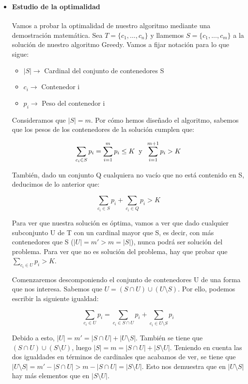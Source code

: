 \documentclass[10pt,a4paper]{article}
\begin{document}
	
	
	\begin{itemize}
		\item \textbf{Estudio de la optimalidad}
		\\
		\\
		Vamos a probar la optimalidad de nuestro algoritmo mediante una demostración matemática. Sea $T = \lbrace c_{1},...,c_{n} \rbrace$ y llamemos $S = \lbrace c_{1},...,c_{m} \rbrace$ a la solución de nuestro algoritmo Greedy. Vamos a fijar notación para lo que sigue:
		
		\begin{itemize}
			\item $|S| \rightarrow$ Cardinal del conjunto de contenedores S
			\item $c_{i} \rightarrow$ Contenedor i
			\item $p_{i} \rightarrow$ Peso del contenedor i
		\end{itemize}
	
	Consideramos que $|S| = m$. Por cómo hemos diseñado el algoritmo, sabemos que los pesos de los contenedores de la solución cumplen que:
	
	\[
	\sum_{c_{i} \in S}p_{i} = \sum_{i = 1}^{m}p_{i} \leq  K \hspace{0.2cm} \text{y} \hspace{0.2cm} \sum_{i = 1}^{m+1}p_{i} > K
	\]
	
	También, dado un conjunto Q cualquiera no vacío que no está contenido en S, deducimos de lo anterior que:
	
	\[
	\sum_{c_{i} \in S}p_{i} + \sum_{c_{i} \in Q}p_{i} > K
	\]
	
	Para ver que nuestra solución es óptima, vamos a ver que dado cualquier subconjunto U de T con un cardinal mayor que S, es decir, con más contenedores que S ($|U| = m' > m = |S|$), nunca podrá ser solución del problema. Para ver que no es solución del problema, hay que probar que $\sum_{c_{i} \in U}p_{i} > K$.
	
	Comenzaremos descomponiendo el conjunto de contenedores U de una forma que nos interesa. Sabemos que $U = (S \cap U) \cup (U\setminus S)$. Por ello, podemos escribir la siguiente igualdad:
	
	\[
	\sum_{c_{i} \in U}p_{i} = \sum_{c_{i} \in S \cap U}p_{i} + \sum_{c_{i} \in U \setminus S}p_{i} 
	\]
	
	Debido a esto, $|U| = m' = |S \cap U| + |U\setminus S|$. También se tiene que $(S \cap U) \cup (S\setminus U)$, luego $|S| = m = |S \cap U| + |S\setminus U|$. Teniendo en cuenta las dos igualdades en términos de cardinales que acabamos de ver, se tiene que $|U \setminus S| = m' - |S \cap U| > m - |S \cap U| = |S \setminus U|$. Esto nos demuestra que en $|U \setminus S|$ hay más elementos que en $|S \setminus U|$.
	

\end{itemize}
\end{document}
